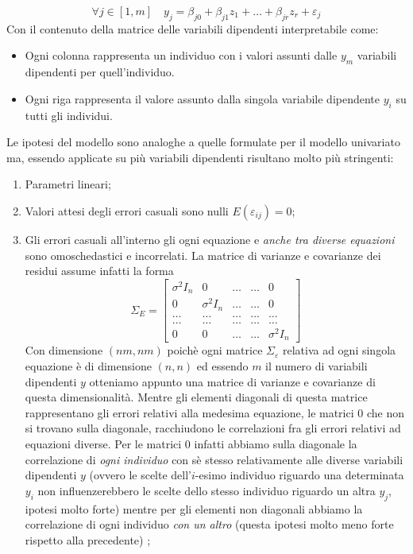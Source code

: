 \documentclass[a4page, 11pt]{article} %
\begin{document}
\[ \forall j \in [1,m] \quad y_j= \beta_{j0} + \beta_{j1}z_1 + \dots + \beta_{jr}z_r + \varepsilon_j \]
Con il contenuto della matrice delle variabili dipendenti interpretabile come:
\begin{itemize}[noitemsep]
\item Ogni colonna rappresenta un individuo con i valori assunti dalle $y_m$ variabili dipendenti per quell'individuo.
\item Ogni riga rappresenta il valore assunto dalla singola variabile dipendente $y_i$ su tutti gli individui.
\end{itemize}
Le ipotesi del modello sono analoghe a quelle formulate per il modello univariato ma, essendo applicate su più variabili dipendenti risultano molto più stringenti:
\begin{enumerate}[noitemsep]
\item Parametri lineari;
\item Valori attesi degli errori casuali sono nulli $E(\varepsilon_{ij}) = 0$;
\item Gli errori casuali all’interno gli ogni equazione e \textit{anche tra diverse equazioni} sono omoschedastici e incorrelati.  La matrice di varianze e covarianze dei residui assume infatti la forma
\[ \Sigma_{E} = 
\begin{bmatrix}
\sigma^2 I_n & 0 & \dots & \dots & 0 \\
0 & \sigma^2 I_n & \dots & \dots &  0 \\
\dots&\dots&\dots&\dots&\dots \\
\dots&\dots&\dots&\dots&\dots \\
0 & 0 & \dots & \dots & \sigma^2 I_n
\end{bmatrix}
\]
Con dimensione $(nm,nm)$ poichè ogni matrice $\Sigma_\varepsilon$ relativa ad ogni singola equazione è di dimensione $(n,n)$ ed essendo $m$ il numero di variabili dipendenti $y$ otteniamo appunto una matrice di varianze e covarianze di questa dimensionalità. Mentre gli elementi diagonali di questa matrice rappresentano gli errori relativi alla medesima equazione, le matrici $0$ che non si trovano sulla diagonale, racchiudono le correlazioni fra gli errori relativi ad equazioni diverse. Per le matrici $0$ infatti abbiamo sulla diagonale la correlazione di \textit{ogni individuo} con sè stesso relativamente alle diverse variabili dipendenti $y$ (ovvero le scelte dell'$i$-esimo individuo riguardo una determinata $y_i$ non influenzerebbero le scelte dello stesso individuo riguardo un altra $y_j$, ipotesi molto forte) mentre per gli elementi non diagonali abbiamo la correlazione di ogni individuo \textit{con un altro} (questa ipotesi molto meno forte rispetto alla precedente) ;

\end{enumerate}
\end{document}
